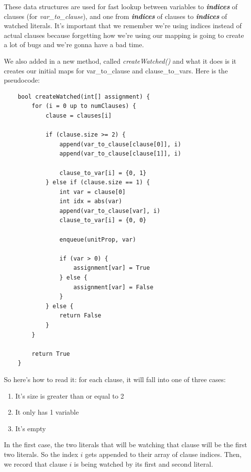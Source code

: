 \documentclass[../main.tex]{subfiles}
\begin{document}
These data structures are used for fast lookup between variables to  
\textbf{\textit{indices}} of clauses (for \textit{var\_to\_clause}), and 
one from \textbf{\textit{indices}} of clauses to \textbf{\textit{indices}} of 
watched literals. It's important that we remember we're using indices instead 
of actual clauses because forgetting how we're using our mapping is going to create 
a lot of bugs and we're gonna have a bad time. 

We also added in a new method, called \textit{createWatched()} and what it does 
is it creates our initial maps for var\_to\_clause and clause\_to\_vars. 
Here is the pseudocode:

\begin{lstlisting}
    bool createWatched(int[] assignment) {
        for (i = 0 up to numClauses) {
            clause = clauses[i]

            if (clause.size >= 2) {
                append(var_to_clause[clause[0]], i)
                append(var_to_clause[clause[1]], i)

                clause_to_var[i] = {0, 1}
            } else if (clause.size == 1) {
                int var = clause[0]
                int idx = abs(var)
                append(var_to_clause[var], i)
                clause_to_var[i] = {0, 0}

                enqueue(unitProp, var)

                if (var > 0) {
                    assignment[var] = True
                } else {
                    assignment[var] = False
                }
            } else {
                return False
            }
        }

        return True
    }
\end{lstlisting}

\noindent So here's how to read it: for each clause, it will fall into one of three cases:
\begin{enumerate}
    \item It's size is greater than or equal to 2
    \item It only has 1 variable
    \item It's empty
\end{enumerate}

In the first case, the two literals that will be watching that clause will be the 
first two literals. So the index $i$ gets appended to their array of clause indices.
Then, we record that clause $i$ is being watched by its first and second literal.
\end{document}
